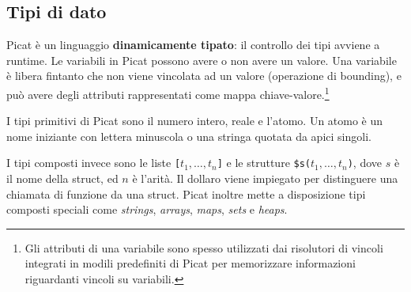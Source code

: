 \documentclass[12pt,a4paper,openright]{book}  %
\begin{document}
\subsection{Tipi di dato}
\label{subsec:picat_base_datatype}

Picat è un linguaggio \textbf{dinamicamente tipato}: il controllo dei
tipi avviene a runtime. Le variabili in Picat possono avere o non
avere un valore. Una variabile è libera fintanto che non viene
vincolata ad un valore (operazione di bounding), e può avere degli
attributi rappresentati come mappa chiave-valore.\footnote{Gli
  attributi di una variabile sono spesso utilizzati dai risolutori di
  vincoli integrati in modili predefiniti di Picat per memorizzare
  informazioni riguardanti vincoli su variabili.}

I tipi primitivi di Picat sono il numero intero, reale e l'atomo. Un
atomo è un nome iniziante con lettera minuscola o una stringa quotata
da apici singoli.

I tipi composti invece sono le liste \verb|[|$t_1, \ldots,
t_n$\verb|]| e le strutture \verb|$s(|$t_1, \ldots, t_n$\verb|)|, dove
$s$ è il nome della struct, ed $n$ è l'arità. Il dollaro viene
impiegato per distinguere una chiamata di funzione da una
struct. Picat inoltre mette a disposizione tipi composti speciali come
\emph{strings}, \emph{arrays}, \emph{maps}, \emph{sets} e
\emph{heaps}.
\end{document}

